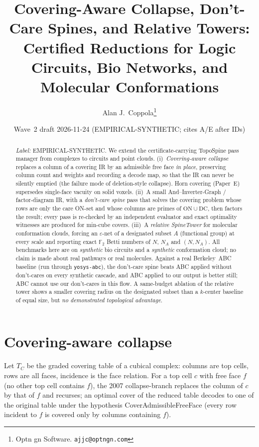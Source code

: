 \documentclass[11pt]{article}
\title{Covering-Aware Collapse, Don't-Care Spines, and Relative Towers:\\
Certified Reductions for Logic Circuits, Bio Networks, and Molecular Conformations}
\author{Alan J.\ Coppola\thanks{Optn gn Software. \texttt{ajjc@optngn.com}}}
\date{Wave~2 draft 2026-11-24 (EMPIRICAL-SYNTHETIC; cites A/E after IDs)}
\begin{document}
\maketitle

\begin{abstract}
\textit{Label:} EMPIRICAL-SYNTHETIC.
We extend the certificate-carrying \textsf{TopoSpine} pass manager from
complexes to circuits and point clouds.  (i)~\emph{Covering-aware collapse}
replaces a column of a covering IR by an admissible free face \emph{in place},
preserving column count and weights and recording a decode map, so that the IR
can never be silently emptied (the failure mode of deletion-style collapse).
Horn covering (Paper~E) supersedes single-face vacuity on solid voxels.
(ii)~A small And--Inverter-Graph / factor-diagram IR, with a
\emph{don't-care spine} pass that solves the covering problem whose rows are only
the care ON-set and whose columns are primes of $\mathrm{ON}\cup\mathrm{DC}$, then
factors the result; every pass is re-checked by an independent evaluator and
exact optimality witnesses are produced for min-cube covers.
(iii)~A \emph{relative SpineTower} for molecular conformation clouds, forcing an
$\varepsilon$-net of a designated subset $A$ (functional group) at every scale
and reporting exact $\mathbb F_2$ Betti numbers of $N$, $N_A$ and $(N,N_A)$.
All benchmarks here are on \emph{synthetic} bio circuits and a \emph{synthetic}
conformation cloud; no claim is made about real pathways or real molecules.
Against a real Berkeley~ABC baseline (run through \texttt{yosys-abc}), the don't-care
spine beats ABC applied without don't-cares on every synthetic cascade, and ABC applied
to our output is better still; ABC cannot use our don't-cares in this flow.  A same-budget
ablation of the relative tower shows a smaller covering radius on the designated subset
than a $k$-center baseline of equal size, but \emph{no demonstrated topological advantage}.
\end{abstract}

\section{Covering-aware collapse}
Let $T_C$ be the graded covering table of a cubical complex: columns are top
cells, rows are all faces, incidence is the face relation.  For a top cell $c$
with free face $f$ (no other top cell contains $f$), the 2007 collapse-branch
replaces the column of $c$ by that of $f$ and recurses; an optimal cover of the
reduced table decodes to one of the original table under the hypothesis
\textsf{CoverAdmissibleFreeFace} (every row incident to $f$ is covered only by
columns containing $f$).
\end{document}
